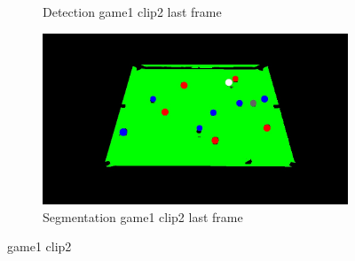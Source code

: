 \begin{figure}[H]
\begin{subfigure}[b]{0.35\textwidth}
        \caption{Detection game1 clip2 last frame}
        \label{fig: game1_clip2_last_frame_detected}
    \end{subfigure}
    \begin{subfigure}[b]{0.35\textwidth}
        \centering
        \includegraphics[width=\textwidth]{images/Segmentation/game1_clip2_segmented_balls_last_frame.jpg}
        \caption{Segmentation game1 clip2 last frame}
		\label{fig: game1_clip2_last_frame_segmented}
    \end{subfigure}
    
	\caption{game1 clip2}
\end{figure}

